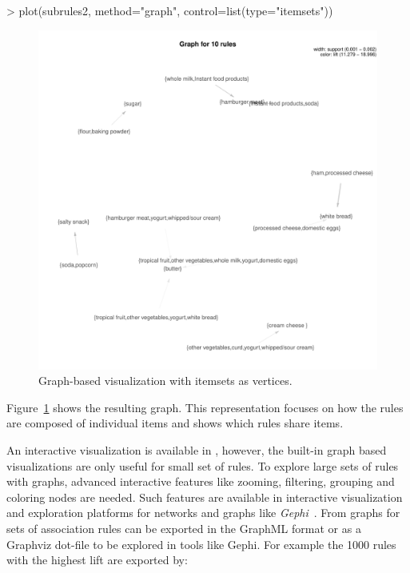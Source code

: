 \documentclass[nojss]{jss}
\begin{document}
\begin{Schunk}
\begin{Sinput}
> plot(subrules2, method="graph", control=list(type="itemsets"))
\end{Sinput}
\end{Schunk}

\begin{figure}
\centering
\includegraphics[width=\linewidth]{arulesViz-graph3}
\caption{Graph-based visualization with itemsets as vertices.
\label{fig:graph3}}
\end{figure}

Figure~\ref{fig:graph3} shows the resulting graph.
This representation focuses on how the rules are composed of individual items
and shows which rules share items.

An interactive visualization is available in ,
however,
the built-in graph based visualizations are only
useful for small set of rules.  To explore large sets of rules with graphs,
advanced interactive features like zooming, filtering, grouping and coloring
nodes are needed. Such features are available in interactive visualization
and exploration platforms for
networks and graphs like \emph{Gephi}~\citep{arules:Bastian:2009}.
From  graphs for sets of association rules can be exported
in the GraphML format
or as a Graphviz dot-file
to be explored in tools like Gephi. For example the
1000 rules with the highest lift are exported by:
\end{document}
